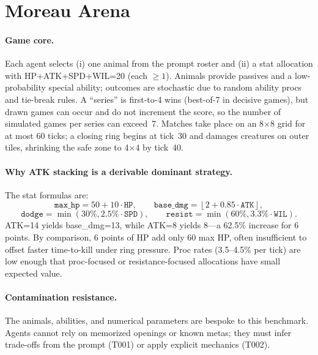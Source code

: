 \documentclass[11pt]{article}
\newcommand{\tOne}{T001}
\newcommand{\tTwo}{T002}
\begin{document}
\section{Moreau Arena}

\paragraph{Game core.}
Each agent selects (i) one animal from the prompt roster and (ii) a stat allocation with HP+ATK+SPD+WIL=20 (each $\ge 1$).
Animals provide passives and a low-probability special ability; outcomes are stochastic due to random ability procs and tie-break rules.
A ``series'' is first-to-4 wins (best-of-7 in decisive games), but drawn games can occur and do not increment the score, so the number of simulated games per series can exceed~7.
Matches take place on an 8$\times$8 grid for at most 60 ticks; a closing ring begins at tick~30 and damages creatures on outer tiles, shrinking the safe zone to 4$\times$4 by tick~40.

\paragraph{Why ATK stacking is a derivable dominant strategy.}
The stat formulas are:
\[
\texttt{max\_hp} = 50 + 10\cdot \texttt{HP},\qquad
\texttt{base\_dmg} = \left\lfloor 2 + 0.85\cdot \texttt{ATK}\right\rfloor,
\]
\[
\texttt{dodge} = \min(30\%, 2.5\%\cdot \texttt{SPD}),\qquad
\texttt{resist} = \min(60\%, 3.3\%\cdot \texttt{WIL}).
\]
ATK=14 yields base\_dmg=13, while ATK=8 yields 8---a 62.5\% increase for 6 points.
By comparison, 6 points of HP add only 60 max HP, often insufficient to offset faster time-to-kill under ring pressure.
Proc rates (3.5--4.5\% per tick) are low enough that proc-focused or resistance-focused allocations have small expected value.

\paragraph{Contamination resistance.}
The animals, abilities, and numerical parameters are bespoke to this benchmark.
Agents cannot rely on memorized openings or known metas; they must infer trade-offs from the prompt (\tOne) or apply explicit mechanics (\tTwo).
\end{document}
